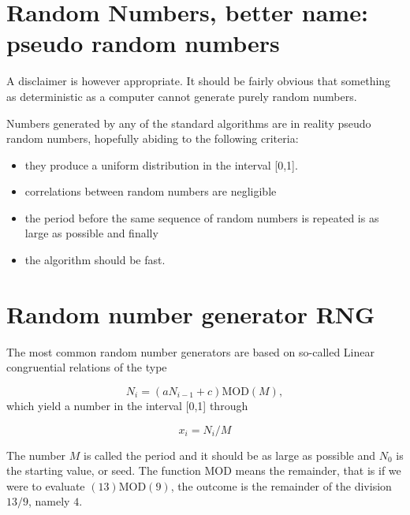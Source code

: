 \documentclass[%
oneside,                 %
final,                   %
10pt]{article}
\newenvironment{block_mdfboxadmon}[1][]{
\begin{block_mdfboxmdframed}[frametitle=#1]
}
{
\end{block_mdfboxmdframed}
}
\begin{document}
\section{Random Numbers, better name: pseudo random numbers}

\begin{block_mdfboxadmon}[]

A disclaimer is however appropriate. It should be fairly obvious that 
something as deterministic as a computer cannot generate purely random numbers.

Numbers generated by any of the standard algorithms are in reality pseudo random
numbers, hopefully abiding to the following criteria:

\begin{itemize}
  \item they produce a uniform distribution in the interval [0,1].

  \item correlations between random numbers are negligible

  \item the period before the same sequence of random numbers is repeated   is as large as possible and finally

  \item the algorithm should be fast.
\end{itemize}

\noindent
\end{block_mdfboxadmon} %




\section{Random number generator RNG}

\begin{block_mdfboxadmon}[]
 The most common random number generators are based on so-called
Linear congruential relations of the type

\begin{equation*}
  N_i=(aN_{i-1}+c) \mathrm{MOD} (M),
\end{equation*}
which yield a number in the interval [0,1] through

\begin{equation*}
  x_i=N_i/M
\end{equation*}

The number 
$M$ is called the period and it should be as large as possible 
 and 
$N_0$ is the starting value, or seed. The function $\mathrm{MOD}$ means the remainder,
that is if we were to evaluate $(13)\mathrm{MOD}(9)$, the outcome is the remainder
of the division $13/9$, namely $4$.
\end{block_mdfboxadmon} %
\end{document}
